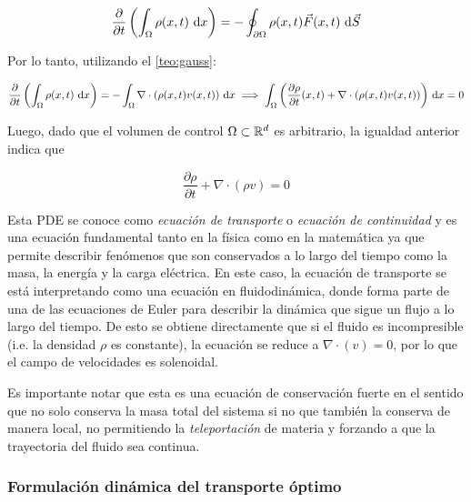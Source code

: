 \begin{equation}
	\frac{\partial}{\partial t}\left(\int_\Omega \rho(x,t) \,\operatorname{d}\! x\right)
	= - \oint_{\partial\Omega} \rho(x,t)\vec{F}(x,t) \,\operatorname{d}\! \vec{S}
\end{equation}

Por lo tanto, utilizando el \autoref{teo:gauss}:

\begin{equation}
	\frac{\partial}{\partial t}\left(\int_\Omega \rho(x,t) \,\operatorname{d}\! x\right)
	= - \int_\Omega \nabla\cdot\left(\rho(x,t)v(x,t)\right) \,\operatorname{d}\! x
	\implies
	\int_\Omega \left(\frac{\partial\rho}{\partial t}(x,t) + \nabla\cdot(\rho(x,t) v(x,t))\right) \,\operatorname{d}\! x = 0
\end{equation}

Luego, dado que el volumen de control $\Omega\subset\mathbb{R}^d$ es arbitrario, la igualdad anterior indica que

\begin{equation}
	\label{eq:transport_eq}
	\frac{\partial\rho}{\partial t} + \nabla\cdot(\rho v) = 0
\end{equation}

Esta PDE se conoce como \textit{ecuación de transporte} o \textit{ecuación de continuidad} y es una ecuación fundamental tanto en la física como en la matemática ya que permite describir fenómenos que son conservados a lo largo del tiempo como la masa, la energía y la carga eléctrica. En este caso, la ecuación de transporte se está interpretando como una ecuación en fluidodinámica, donde forma parte de una de las ecuaciones de Euler para describir la dinámica que sigue un flujo a lo largo del tiempo. De esto se obtiene directamente que si el fluido es incompresible (i.e. la densidad $\rho$ es constante), la ecuación se reduce a $\nabla\cdot(v) = 0$, por lo que el campo de velocidades es solenoidal.


Es importante notar que esta es una ecuación de conservación fuerte en el sentido que no solo conserva la masa total del sistema si no que también la conserva de manera local, no permitiendo la \textit{teleportación} de materia y forzando a que la trayectoria del fluido sea continua.

\subsubsection{Formulación dinámica del transporte óptimo}

